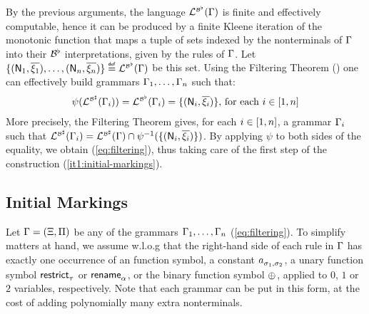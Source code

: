 By the previous arguments, the language
$\mathcal{L}_{}^{\scriptscriptstyle{{\mathcal{B}}^\flat}}({\Gamma})$ is finite and effectively
computable, hence it can be produced by a finite Kleene iteration of
the monotonic function that maps a tuple of sets indexed by the
nonterminals of $\Gamma$ into their ${\mathcal{B}}^\flat$
interpretations, given by the rules of $\Gamma$.  Let
${\{ {(\mathsf{N}_1, \overline{\xi_1}), \ldots, (\mathsf{N}_n,
  \overline{\xi_n})} \}} \stackrel{\scriptscriptstyle{\mathsf{def}}}{=}
\mathcal{L}_{}^{\scriptscriptstyle{{\mathcal{B}}^\flat}}({\Gamma})$ be this set. Using the
Filtering Theorem () one can effectively build
grammars $\Gamma_1, \ldots, \Gamma_n$ such that:
\begin{align}\label{eq:filtering}
  \psi(\mathcal{L}_{}^{\scriptscriptstyle{{\mathcal{B}}^\sharp}}({\Gamma_i})) =
  \mathcal{L}_{}^{\scriptscriptstyle{{\mathcal{B}}^\flat}}({\Gamma_i}) =
  {\{ {(\mathsf{N}_i,\overline{\xi_i})} \}} \text{, for each } i \in {[{1},{n}]}
\end{align}
More precisely, the Filtering Theorem gives, for each $i \in
{[{1},{n}]}$, a grammar $\Gamma_i$ such that
$\mathcal{L}_{}^{\scriptscriptstyle{{\mathcal{B}}^\sharp}}({\Gamma_i}) =
\mathcal{L}_{}^{\scriptscriptstyle{{\mathcal{B}}^\sharp}}({\Gamma}) \cap
\psi^{-1}({\{ {(\mathsf{N}_i,\overline{\xi_i})} \}})$. By applying $\psi$
to both sides of the equality, we obtain (\autoref{eq:filtering}),
thus taking care of the first step of the construction
(\ref{it1:initial-markings}).

\subsection{Initial Markings}

Let $\Gamma=(\Xi,\Pi)$ be any of the grammars $\Gamma_1,
\ldots, \Gamma_n$ (\autoref{eq:filtering}). To simplify matters at
hand, we assume w.l.o.g that the right-hand side of each rule in
$\Gamma$ has exactly one occurrence of an \hrtext{} function symbol,
\ie a constant ${a}^{}_{{\sigma_1},{\sigma_2}}$, a unary function
symbol $\mathsf{restrict}^{}_{{\tau}}$ or $\mathsf{rename}^{}_{{\alpha}}$, or the binary
function symbol $\oplus^{}$, applied to $0$, $1$ or $2$ variables,
respectively. Note that each grammar can be put in this form, at the
cost of adding polynomially many extra nonterminals.

